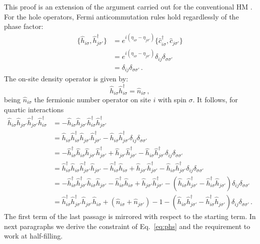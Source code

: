 \begin{tabproof}

	This proof is an extension of the argument carried out for the conventional HM \cite{arovas2022hubbard}. For the hole operators, Fermi anticommutation rules hold regardlessly of the phase factor:
	\[
	\begin{aligned}
		\lbrace \hat h_{i\sigma}, \hat h_{j\sigma'}^\dagger \rbrace &= e^{i(\eta_{i\sigma}-\eta_{j\sigma'})} \lbrace \hat c_{i\sigma}^\dagger, \hat c_{j\sigma'} \rbrace \\
		&= e^{i(\eta_{i\sigma}-\eta_{j\sigma'})} \delta_{ij} \delta_{\sigma\sigma'} \\
		&= \delta_{ij} \delta_{\sigma\sigma'} \, .
	\end{aligned}
	\]
	The on-site density operator is given by:
	\[
		\hat h_{i\sigma} \hat h_{i\sigma}^\dagger = \hat n_{i\sigma} \, ,
	\]
	being $\hat n_{i\sigma}$ the fermionic number operator on site $i$ with spin $\sigma$. It follows, for quartic interactions
	\begin{align}
		\hat h_{i\sigma} \hat h_{j\sigma'} \hat h_{j\sigma'}^\dagger \hat h_{i\sigma}^\dagger &= -\hat h_{i\sigma} \hat h_{j\sigma'} \hat h_{i\sigma}^\dagger \hat h_{j\sigma'}^\dagger \nonumber \\
		&= \hat h_{i\sigma} \hat h_{i\sigma}^\dagger \hat h_{j\sigma'} \hat h_{j\sigma'}^\dagger - \hat h_{i\sigma} \hat h_{j\sigma'}^\dagger \delta_{ij}\delta_{\sigma\sigma'} \nonumber \\
		&= - \hat h_{i\sigma}^\dagger \hat h_{i\sigma} \hat h_{j\sigma'} \hat h_{j\sigma'}^\dagger + \hat h_{j\sigma'} \hat h_{j\sigma'}^\dagger - \hat h_{i\sigma} \hat h_{j\sigma'}^\dagger \delta_{ij}\delta_{\sigma\sigma'} \nonumber \\
		&= \hat h_{i\sigma}^\dagger \hat h_{i\sigma} \hat h_{j\sigma'}^\dagger \hat h_{j\sigma'} - \hat h_{i\sigma}^\dagger \hat h_{i\sigma} + \hat h_{j\sigma'} \hat h_{j\sigma'}^\dagger - \hat h_{i\sigma} \hat h_{j\sigma'}^\dagger \delta_{ij}\delta_{\sigma\sigma'} \nonumber \\
		&= - \hat h_{i\sigma}^\dagger \hat h_{j\sigma'}^\dagger \hat h_{i\sigma} \hat h_{j\sigma'} - \hat h_{i\sigma}^\dagger \hat h_{i\sigma} + \hat h_{j\sigma'} \hat h_{j\sigma'}^\dagger - \left(
			\hat h_{i\sigma} \hat h_{j\sigma'}^\dagger - \hat h_{i\sigma}^\dagger \hat h_{j\sigma'}
		\right) \delta_{ij}\delta_{\sigma\sigma'} \nonumber \\
		&= \hat h_{i\sigma}^\dagger \hat h_{j\sigma'}^\dagger \hat h_{j\sigma'} \hat h_{i\sigma} + \left(
			\hat n_{i\sigma} + \hat n_{j\sigma'}
		\right) - 1 - \left(
			\hat h_{i\sigma} \hat h_{j\sigma'}^\dagger - \hat h_{i\sigma}^\dagger \hat h_{j\sigma'}
		\right) \delta_{ij}\delta_{\sigma\sigma'} \, . \label{eq:phs-hhhh-chain}
	\end{align}
	The first term of the last passage is mirrored with respect to the starting term. In next paragraphs we derive the constraint of Eq.~\eqref{eq:phs} and the requirement to work at half-filling.
	

\end{tabproof}

